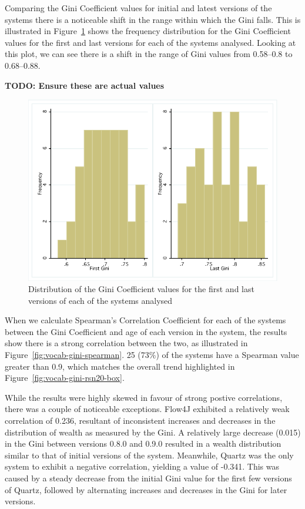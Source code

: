 Comparing the Gini Coefficient values for initial and latest versions of the systems there is a noticeable shift in the range within which the Gini falls. This is illustrated in Figure~\ref{fig:vocab-firstlastgini-dist} shows the frequency distribution for the Gini Coefficient values for the first and last versions for each of the systems analysed. Looking at this plot, we can see there is a shift in the range of Gini values from 0.58--0.8 to 0.68--0.88.

\textbf{TODO: Ensure these are actual values}

\begin{figure}[t]
\centering
\includegraphics[width=\textwidth]{Figures/Vocab-FirstLastGini.pdf}
\caption{Distribution of the Gini Coefficient values for the first and last versions of each of the systems analysed}
\label{fig:vocab-firstlastgini-dist}
\end{figure}

When we calculate Spearman's Correlation Coefficient for each of the systems between the Gini Coefficient and age of each version in the system, the results show there is a strong correlation between the two, as illustrated in Figure~\ref{fig:vocab-gini-spearman}. 25 (73\%) of the systems have a Spearman value greater than 0.9, which matches the overall trend highlighted in Figure~\ref{fig:vocab-gini-rsn20-box}.

While the results were highly skewed in favour of strong postive correlations, there was a couple of noticeable exceptions. Flow4J exhibited a relatively weak correlation of 0.236, resultant of inconsistent increases and decreases in the distribution of wealth as measured by the Gini. A relatively large decrease (0.015) in the Gini between versions 0.8.0 and 0.9.0 resulted in a wealth distribution similar to that of initial versions of the system. Meanwhile, Quartz was the only system to exhibit a negative correlation, yielding a value of -0.341. This was caused by a steady decrease from the initial Gini value for the first few versions of Quartz, followed by alternating increases and decreases in the Gini for later versions.

